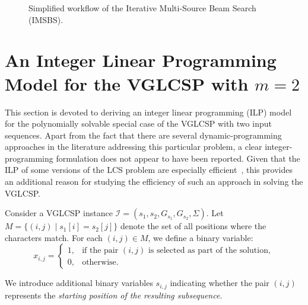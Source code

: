 \documentclass[runningheads]{llncs}
\begin{document}
\begin{figure}[!ht]
{}
		
		\caption{Simplified workflow of the Iterative Multi-Source Beam Search (IMSBS).}
		\label{fig:imsbs_workflow}
	\end{figure}
	
	\section{An Integer Linear Programming Model for the  VGLCSP with $m=2$}\label{sec:ilp_2vglcsp}
	
	This section is devoted to deriving an integer linear programming (ILP) model for the polynomially solvable special case of the VGLCSP with two input sequences. Apart from the fact that there are several dynamic-programming approaches in the literature addressing this particular problem, a clear integer-programming formulation does not appear to have been reported. Given that the ILP of some versions of the LCS problem are especially efficient~\cite{blum2021solving}, this provides an additional reason for studying the efficiency of such an approach in solving the VGLCSP. 
	
	
	Consider a VGLCSP instance $\mathcal{I}=(s_1, s_2, G_{s_1}, G_{s_2}, \Sigma)$. Let $M = \{ (i,j) \mid s_1[i] = s_2[j] \}$ denote the set of all positions where the characters match. For each $(i,j) \in M$, we define a binary variable:
	\[
	x_{i,j} =
	\begin{cases}
		1, & \textrm{if the pair } (i,j) \textrm{ is selected as part of the solution}, \\
		0, & \textrm{otherwise}.
	\end{cases}
	\]
	
	We introduce additional binary variables $s_{i,j}$ indicating whether the pair $(i,j)$ represents the \emph{starting position of the resulting subsequence}. \\
	
\end{document}
